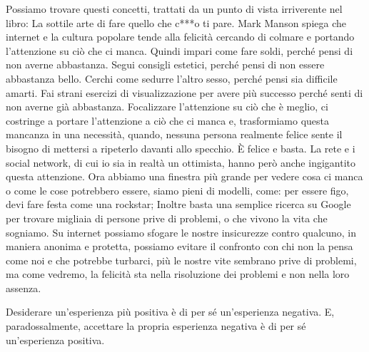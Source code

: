 \documentclass[12pt]{book} %
\begin{document}
Possiamo trovare questi concetti, trattati da un punto di vista irriverente nel libro: La sottile arte di fare quello
che c***o ti pare. Mark Manson spiega che internet e la cultura popolare
tende alla felicità cercando di colmare e portando l'attenzione su ciò che ci manca. Quindi impari
come fare soldi, perché pensi di non averne abbastanza. Segui consigli estetici, perché pensi di non essere abbastanza
bello. Cerchi come sedurre l'altro sesso, perché pensi sia difficile amarti. Fai strani esercizi
di visualizzazione per avere più successo perché senti di non averne già abbastanza. Focalizzare
l'attenzione su ciò che è meglio, ci costringe a portare l'attenzione a ciò
che ci manca e, trasformiamo questa mancanza in una necessità, quando, nessuna persona realmente felice sente il
bisogno di mettersi a ripeterlo davanti allo specchio. È felice e basta. La rete e i social network, di cui io sia in
realtà un ottimista, hanno però anche ingigantito questa attenzione. Ora abbiamo una finestra più grande per vedere
cosa ci manca o come le cose potrebbero essere, siamo pieni di modelli, come: per essere figo, devi fare festa come una
rockstar; Inoltre basta una semplice ricerca su Google per trovare migliaia di persone prive di problemi, o che vivono
la vita che sogniamo. Su internet possiamo sfogare le nostre insicurezze contro qualcuno, in maniera anonima e
protetta, possiamo evitare il confronto con chi non la pensa come noi e che potrebbe turbarci, più le nostre vite
sembrano prive di problemi, ma come vedremo, la felicità sta nella risoluzione dei problemi e non nella loro assenza.

Desiderare un'esperienza più positiva è di per sé un'esperienza negativa. E,
paradossalmente, accettare la propria esperienza negativa è di per sé un'esperienza positiva.
\end{document}

